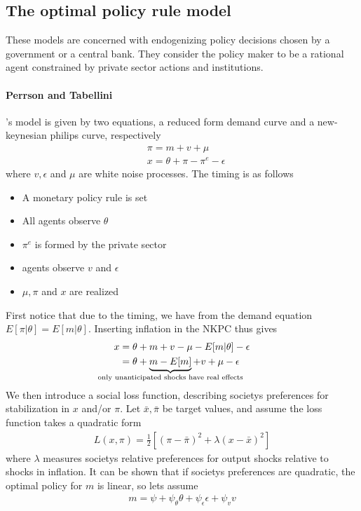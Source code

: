 \documentclass[12pt, a4paper]{article}
\begin{document}
\begin{spacing}{1.213}
\section{The optimal policy rule model}
These models are concerned with endogenizing policy decisions chosen by a government or a central bank. They consider the policy maker to be a rational agent constrained by private sector actions and institutions. 

\paragraph{Perrson and Tabellini}'s model is given by two equations, a reduced form demand curve and a new-keynesian philips curve, respectively
\begin{align*}
&\pi = m + v + \mu \\
& x = \theta + \pi - \pi^e - \epsilon
\end{align*}
where $v, \epsilon$ and $\mu$ are white noise processes. The timing is as follows 
\begin{itemize}
\item A monetary policy rule is set
\item All agents observe $\theta$ 
\item $\pi^e$ is formed by the private sector
\item agents observe $v$ and $\epsilon$
\item $\mu, \pi$ and $x$ are realized
\end{itemize}
First notice that due to the timing, we have from the demand equation $E[\pi| \theta] = E[m|\theta]$. Inserting inflation in the NKPC thus gives
\begin{align*}
x &= \theta + m + v -\mu - E[m|\theta] - \epsilon \\
& = \theta + \underbrace{m - E[m]}_{\mathclap{\text{only unanticipated shocks have real effects}}} + v + \mu - \epsilon
\end{align*}
We then introduce a social loss function, describing societys preferences for stabilization in $x$ and/or $\pi$. Let $\bar{x}, \bar{\pi}$ be target values, and assume the loss function takes a quadratic form 
\begin{align*}
L(x, \pi) = \frac{1}{2}[(\pi - \bar{\pi})^2 + \lambda (x - \bar{x})^2 ]
\end{align*}
where $\lambda$ measures societys relative preferences for output shocks relative to shocks in inflation. It can be shown that if societys preferences are quadratic, the optimal policy for $m$ is linear, so lets assume 
\begin{align*}
m = \psi + \psi_{\theta} \theta + \psi_{\epsilon} \epsilon + \psi_v v
\end{align*}

\end{spacing}
\end{document}
